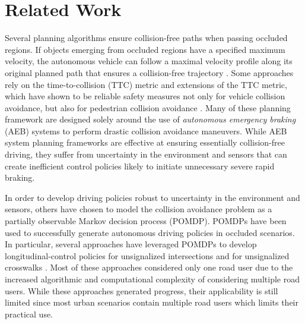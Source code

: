 \documentclass[conference]{IEEEtran}
\begin{document}
\section{Related Work}
\label{sec:related-work}

Several planning algorithms ensure collision-free paths when passing occluded regions. If objects emerging from occluded regions have a specified maximum velocity, the autonomous vehicle can follow a maximal velocity profile along its original planned path that ensures a collision-free trajectory \cite{Alami2002OnPlans}. Some approaches rely on the time-to-collision (TTC) metric and extensions of the TTC metric, which have shown to be reliable safety measures not only for vehicle collision avoidance, but also for pedestrian collision avoidance \cite{Minderhoud2001ExtendedAssessment, Volz2019InferringCrosswalks}. Many of these planning framework are designed solely around the use of \textit{autonomous emergency braking} (AEB) systems to perform drastic collision avoidance maneuvers. While AEB system planning frameworks are effective at ensuring essentially collision-free driving, they suffer from uncertainty in the environment and sensors that can create inefficient control policies likely to initiate unnecessary severe rapid braking.

In order to develop driving policies robust to uncertainty in the environment and sensors, others have chosen to model the collision avoidance problem as a partially observable Markov decision process (POMDP). POMDPs have been used to successfully generate autonomous driving policies in occluded scenarios. In particular, several approaches have leveraged POMDPs to develop longitudinal-control policies for unsignalized intersections \cite{Brechtel2014ProbabilisticPOMDPs, Hubmann2019AScenarios} and for unsignalized crosswalks \cite{Thornton2018ValuePlanning, Thornton2019TowardValues, Kapania2019ACrosswalks}. Most of these approaches considered only one road user due to the increased algorithmic and computational complexity of considering multiple road users. While these approaches generated progress, their applicability is still limited since most urban scenarios contain multiple road users which limits their practical use.
\end{document}
